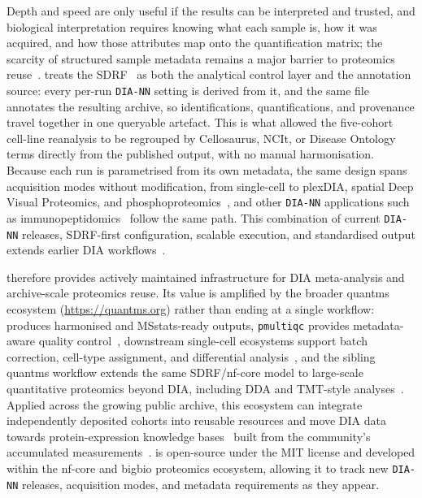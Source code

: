 \documentclass[preprint,12pt]{elsarticle}
\begin{document}
Depth and speed are only useful if the results can be interpreted and trusted, and biological interpretation requires knowing what each sample is, how it was acquired, and how those attributes map onto the quantification matrix; the scarcity of structured sample metadata remains a major barrier to proteomics reuse~\cite{perezriverol2020metadata,perezriverol2022reuse,deutsch2026proteomexchange}. \quantmsdiann{} treats the SDRF~\cite{dai2021sdrf} as both the analytical control layer and the annotation source: every per-run \texttt{DIA-NN} setting is derived from it, and the same file annotates the resulting \qpx{} archive, so identifications, quantifications, and provenance travel together in one queryable artefact. This is what allowed the five-cohort cell-line reanalysis to be regrouped by Cellosaurus, NCIt, or Disease Ontology terms directly from the published output, with no manual harmonisation. Because each run is parametrised from its own metadata, the same design spans acquisition modes without modification, from single-cell to plexDIA, spatial Deep Visual Proteomics, and phosphoproteomics~\cite{brunner2022,derks2023,mund2022,makhmut2023}, and other \texttt{DIA-NN} applications such as immunopeptidomics~\cite{scheid2025mhcquant2} follow the same path. This combination of current \texttt{DIA-NN} releases, SDRF-first configuration, scalable execution, and standardised \qpx{} output extends earlier DIA workflows~\cite{bichmann2021diaproteomics}.

\quantmsdiann{} therefore provides actively maintained infrastructure for DIA meta-analysis and archive-scale proteomics reuse. Its value is amplified by the broader quantms ecosystem (\url{https://quantms.org}) rather than ending at a single workflow: \quantmsdiann{} produces harmonised \qpx{} and MSstats-ready outputs, \texttt{pmultiqc} provides metadata-aware quality control~\cite{yue2026pmultiqc}, downstream single-cell ecosystems support batch correction, cell-type assignment, and differential analysis~\cite{vanderaa2023,virshup2023scverse}, and the sibling quantms workflow extends the same SDRF/nf-core model to large-scale quantitative proteomics beyond DIA, including DDA and TMT-style analyses~\cite{dai2024quantms}. Applied across the growing public archive, this ecosystem can integrate independently deposited cohorts into reusable resources and move DIA data towards protein-expression knowledge bases~\cite{lautenbacher2022proteomicsdb} built from the community's accumulated measurements~\cite{perezriverol2025pride}. \quantmsdiann{} is open-source under the MIT license and developed within the nf-core and bigbio proteomics ecosystem, allowing it to track new \texttt{DIA-NN} releases, acquisition modes, and metadata requirements as they appear.
\end{document}
